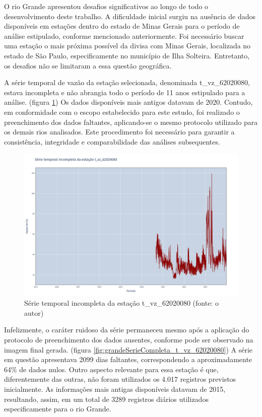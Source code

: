 O rio Grande apresentou desafios significativos ao longo de todo o desenvolvimento deste trabalho. A dificuldade inicial surgiu na ausência de dados disponíveis em estações dentro do estado de Minas Gerais para o período de análise estipulado, conforme mencionado anteriormente. Foi necessário buscar uma estação o mais próxima possível da divisa com Minas Gerais, localizada no estado de São Paulo, especificamente no município de Ilha Solteira. Entretanto, os desafios não se limitaram a essa questão geográfica.

A série temporal de vazão da estação selecionada, denominada t\_vz\_62020080, estava incompleta e não abrangia todo o período de 11 anos estipulado para a análise. (figura \ref{fig:grandeSerieIncompleta_t_vz_62020080}) Os dados disponíveis mais antigos datavam de 2020. Contudo, em conformidade com o escopo estabelecido para este estudo, foi realizado o preenchimento dos dados faltantes, aplicando-se o mesmo protocolo utilizado para os demais rios analisados. Este procedimento foi necessário para garantir a consistência, integridade e comparabilidade das análises subsequentes.

\begin{figure}[!h]
\centering
\includegraphics[scale=0.25]{Figuras/rio_grande/grandeSerieIncompleta_t_vz_62020080.png}
\caption{Série temporal incompleta da estação t\_vz\_62020080 (fonte: o autor)}
\label{fig:grandeSerieIncompleta_t_vz_62020080}
\end{figure}

Infelizmente, o caráter ruidoso da série permaneceu mesmo após a aplicação do protocolo de preenchimento dos dados ausentes, conforme pode ser observado na imagem final gerada. (figura \ref{fig:grandeSerieCompleta_t_vz_62020080}) A série em questão apresentava 2099 dias faltantes, correspondendo a aproximadamente 64\% de dados nulos. Outro aspecto relevante para essa estação é que, diferentemente das outras, não foram utilizados os 4.017 registros previstos inicialmente. As informações mais antigas disponíveis datavam de 2015, resultando, assim, em um total de 3289 registros diários utilizados especificamente para o rio Grande.

